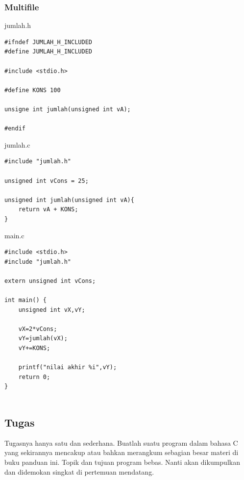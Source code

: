 \documentclass[12pt,]{article}
\begin{document}
	\subsubsection{Multifile}
	
	jumlah.h
	\begin{verbatim}
#ifndef JUMLAH_H_INCLUDED
#define JUMLAH_H_INCLUDED

#include <stdio.h>

#define KONS 100

unsigne int jumlah(unsigned int vA);

#endif
	\end{verbatim}
	
	jumlah.c
	\begin{verbatim}
#include "jumlah.h"

unsigned int vCons = 25;

unsigned int jumlah(unsigned int vA){
	return vA + KONS;
}
	\end{verbatim}
	
	\newpage	
	main.c
	\begin{verbatim}
#include <stdio.h>
#include "jumlah.h"

extern unsigned int vCons;

int main() {
	unsigned int vX,vY;
	
	vX=2*vCons;
	vY=jumlah(vX);
	vY+=KONS;
	
	printf("nilai akhir %i",vY);
	return 0;
}
	
	\end{verbatim}
	
	\newpage
	\subsection{Tugas}
	
	Tugasnya hanya satu dan sederhana.
	Buatlah suatu program dalam bahasa C yang sekirannya mencakup atau bahkan merangkum sebagian besar materi di buku panduan ini.
	Topik dan tujuan program bebas.
	Nanti akan dikumpulkan dan didemokan singkat di pertemuan mendatang.
	
\end{document}
